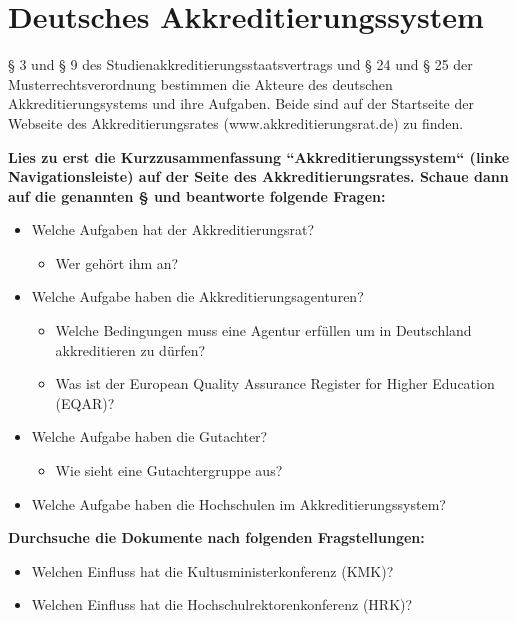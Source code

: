 \documentclass{scrartcl}
\begin{document}
\section*{Deutsches Akkreditierungssystem}

§ 3 und § 9 des Studienakkreditierungsstaatsvertrags und § 24 und § 25 der Musterrechtsverordnung bestimmen die Akteure des deutschen Akkreditierungsystems und ihre Aufgaben. Beide sind auf der Startseite der Webseite des Akkreditierungsrates (www.akkreditierungsrat.de) zu finden. \\

\vspace{1cm}

\textbf{Lies zu erst die Kurzzusammenfassung ``Akkreditierungssystem`` (linke Navigationsleiste) auf der Seite des Akkreditierungsrates. Schaue dann auf die genannten § und beantworte folgende Fragen:}

\begin{itemize}
\item Welche Aufgaben hat der Akkreditierungsrat?
	\begin{itemize}
		\item Wer gehört ihm an?
	\end{itemize}
\item Welche Aufgabe haben die Akkreditierungsagenturen? 
	\begin{itemize}
		\item Welche Bedingungen muss eine Agentur erfüllen um in Deutschland akkreditieren zu dürfen?
		\item Was ist der European Quality Assurance Register for Higher Education (EQAR)?
	\end{itemize}
\item Welche Aufgabe haben die Gutachter? 
	\begin{itemize}
		\item Wie sieht eine Gutachtergruppe aus?
	\end{itemize}
\item Welche Aufgabe haben die Hochschulen im Akkreditierungssystem?
\end{itemize}

\textbf{Durchsuche die Dokumente nach folgenden Fragstellungen:}
\begin{itemize}
\item Welchen Einfluss hat die Kultusministerkonferenz (KMK)?
\item Welchen Einfluss hat die Hochschulrektorenkonferenz (HRK)?
\end{itemize}
\end{document}
